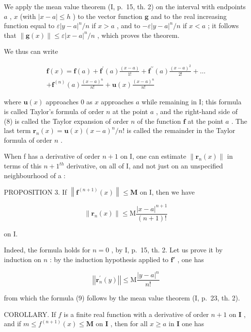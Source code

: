 We apply the mean value theorem (I, p.~15, th. 2) on the interval with endpoints \(a\) , \(x\) (with \(|x - a| \leqslant h\) ) to the vector function \(\mathbf{g}\) and to the real increasing function equal to \(\varepsilon |y - a|^n / n\) if \(x > a\) , and to \(-\varepsilon |y - a|^n / n\) if \(x < a\) ; it follows that \(\| \mathbf{g}(x) \| \leqslant \varepsilon |x - a|^n / n\) , which proves the theorem.

We thus can write

\[
\begin{array}{c} \mathbf {f} (x) = \mathbf {f} (a) + \mathbf {f} ^ {\prime} (a) \frac {(x - a)}{1 !} + \mathbf {f} ^ {\prime \prime} (a) \frac {(x - a) ^ {2}}{2 !} + \dots \\ + \mathbf {f} ^ {(n)} (a) \frac {(x - a) ^ {n}}{n !} + \mathbf {u} (x) \frac {(x - a) ^ {n}}{n !} \end{array}\tag{8}
\]

where \(\mathbf{u}(x)\) approaches 0 as \(x\) approaches \(a\) while remaining in I; this formula is called Taylor's formula of order \(n\) at the point \(a\) , and the right-hand side of (8) is called the Taylor expansion of order \(n\) of the function \(\mathbf{f}\) at the point \(a\) . The last term \(\mathbf{r}_n(x) = \mathbf{u}(x)(x - a)^n / n!\) is called the remainder in the Taylor formula of order \(n\) .

When f has a derivative of order \(n + 1\) on I, one can estimate \(\|\mathbf{r}_{n}(x)\|\) in terms of this \(n + 1^{th}\) derivative, on all of I, and not just on an unspecified neighbourhood of a :

PROPOSITION 3. If \(\left\| \mathbf{f}^{(n + 1)}(x)\right\| \leqslant \mathbf{M}\) on I, then we have

\[
\| \mathbf {r} _ {n} (x) \| \leqslant \mathrm{M} \frac {| x - a | ^ {n + 1}}{(n + 1) !}\tag{9}
\]

on I.

Indeed, the formula holds for \(n = 0\) , by I, p.~15, th. 2. Let us prove it by induction on \(n\) : by the induction hypothesis applied to \(\mathbf{f}'\) , one has

\[
\left| \left| \mathbf {r} _ {n} ^ {\prime} (y) \right| \right| \leqslant \mathrm{M} \frac {| y - a | ^ {n}}{n !}
\]

from which the formula (9) follows by the mean value theorem (I, p.~23, th. 2).

COROLLARY. If \(f\) is a finite real function with a derivative of order \(n + 1\) on \(\mathbf{I}\) , and if \(m \leqslant f^{(n + 1)}(x) \leqslant \mathbf{M}\) on \(\mathbf{I}\) , then for all \(x \geqslant a\) in \(\mathbf{I}\) one has

